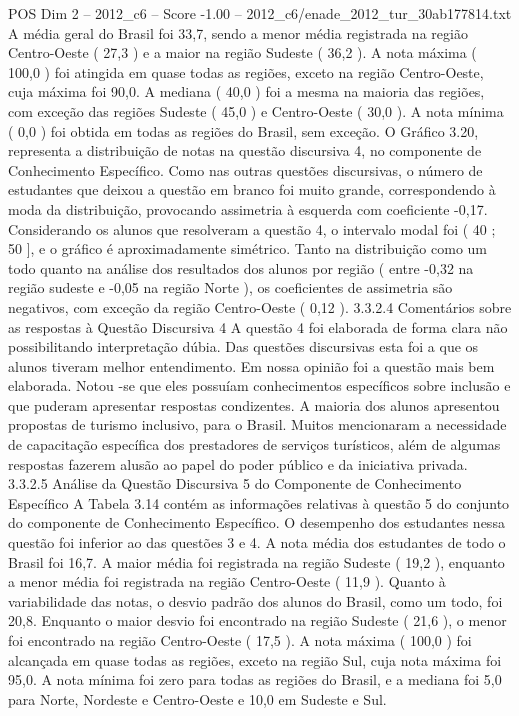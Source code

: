 \begin{textsample}{POS Dim 2 – 2012\_c6 – Score -1.00 – 2012\_c6/enade\_2012\_tur\_30ab177814.txt}
A média geral do Brasil foi 33,7, sendo a menor média registrada na região Centro-Oeste ( 27,3 ) e a maior na região Sudeste ( 36,2 ).
A nota máxima ( 100,0 ) foi atingida em quase todas as regiões, exceto na região Centro-Oeste, cuja máxima foi 90,0.
A mediana ( 40,0 ) foi a mesma na maioria das regiões, com exceção das regiões Sudeste ( 45,0 ) e Centro-Oeste ( 30,0 ).
A nota mínima ( 0,0 ) foi obtida em todas as regiões do Brasil, sem exceção.
O Gráfico 3.20, representa a distribuição de notas na questão discursiva 4, no componente de Conhecimento Específico.
Como nas outras questões discursivas, o número de estudantes que deixou a questão em branco foi muito grande, correspondendo à moda da distribuição, provocando assimetria à esquerda com coeficiente -0,17.
Considerando os alunos que resolveram a questão 4, o intervalo modal foi ( 40 ; 50 ], e o gráfico é aproximadamente simétrico.
Tanto na distribuição como um todo quanto na análise dos resultados dos alunos por região ( entre -0,32 na região sudeste e -0,05 na região Norte ), os coeficientes de assimetria são negativos, com exceção da região Centro-Oeste ( 0,12 ). 3.3.2.4 Comentários sobre as respostas à Questão Discursiva 4 A questão 4 foi elaborada de forma clara não possibilitando interpretação dúbia.
Das questões discursivas esta foi a que os alunos tiveram melhor entendimento.
Em nossa opinião foi a questão mais bem elaborada.
Notou -se que eles possuíam conhecimentos específicos sobre inclusão e que puderam apresentar respostas condizentes.
A maioria dos alunos apresentou propostas de turismo inclusivo, para o Brasil.
Muitos mencionaram a necessidade de capacitação específica dos prestadores de serviços turísticos, além de algumas respostas fazerem alusão ao papel do poder público e da iniciativa privada. 3.3.2.5 Análise da Questão Discursiva 5 do Componente de Conhecimento Específico A Tabela 3.14 contém as informações relativas à questão 5 do conjunto do componente de Conhecimento Específico.
O desempenho dos estudantes nessa questão foi inferior ao das questões 3 e 4.
A nota média dos estudantes de todo o Brasil foi 16,7.
A maior média foi registrada na região Sudeste ( 19,2 ), enquanto a menor média foi registrada na região Centro-Oeste ( 11,9 ).
Quanto à variabilidade das notas, o desvio padrão dos alunos do Brasil, como um todo, foi 20,8.
Enquanto o maior desvio foi encontrado na região Sudeste ( 21,6 ), o menor foi encontrado na região Centro-Oeste ( 17,5 ).
A nota máxima ( 100,0 ) foi alcançada em quase todas as regiões, exceto na região Sul, cuja nota máxima foi 95,0.
A nota mínima foi zero para todas as regiões do Brasil, e a mediana foi 5,0 para Norte, Nordeste e Centro-Oeste e 10,0 em Sudeste e Sul.

\end{textsample}
